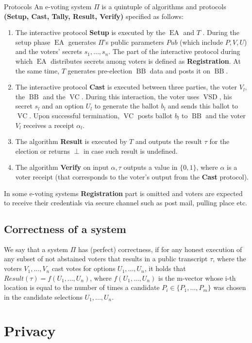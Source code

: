 \documentclass[12pt]{article}
\DeclareMathOperator{\vsd}{VSD}
\DeclareMathOperator{\ea}{EA}
\DeclareMathOperator{\bb}{BB}
\DeclareMathOperator{\voc}{VC}
\begin{document}
Protocols
An e-voting system $\Pi$ is a quintuple of algorithms and protocols  \textbf{(Setup, Cast, Tally, Result, Verify)} specified as follows:
\begin{enumerate}
\item The interactive protocol \textbf{Setup} is executed by the $\ea$ and $T$ . During the setup phase $\ea$ generates $\Pi$'s public parameters $Pub$ (which include $P, V, U$) and the voters' secrets $s_1, \dots , s_n$. The part of the interactive protocol during which $\ea$ distributes secrets among voters is defined as \textbf{Registration}. At the same time, $T$ generates pre-election $\bb$ data and posts it on $\bb$.
\item The interactive protocol \textbf{Cast} is executed between three parties, the voter $V_l$, the $\bb$ and the $\voc$. During this interaction, the voter uses $\vsd$, his secret $s_l$ and an option $U_l$ to generate the ballot $b_l$ and sends this ballot to $\voc$. Upon successful termination, $\voc$ posts ballot $b_l$ to $\bb$ and the voter $V_l$ receives a receipt $\alpha_l$.
\item The algorithm \textbf{Result} is executed by $T$ and outputs the result $\tau$ for the election or returns $\perp$ in case such result is undefined.
\item  The algorithm \textbf{Verify} on input $\alpha,\tau$ outputs a value in $\{0,1\}$, where  $\alpha$ is a voter receipt (that corresponds to the voter's output from the \textbf{Cast} protocol).
\end{enumerate}
In some e-voting systems \textbf{Registration} part is omitted and voters are expected to receive their credentials via secure channel such as post mail, pulling place etc.
\subsection{Correctness of a system}
We say that a system $\Pi$ has (perfect) correctness, if for any honest execution of any subset of not abstained voters that results in a public transcript $\tau$, where the voters $V_1, . . . , V_n$ cast votes for options $U_1, . . . , U_n$, it holds that $Result(\tau) = f(U_1,...,U_n)$, where $f(U_1,...,U_n)$ is the m-vector whose i-th location is equal to the number of times a candidate $P_i \in \{P_1,\dots, P_m\}$ was chosen in the candidate selections $U_1, . . . , U_n$.
%

\section{Privacy}
\end{document}
